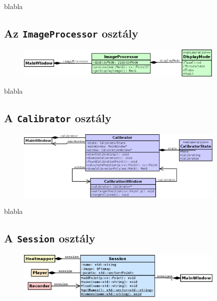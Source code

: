 blabla

\subsection{Az \texttt{ImageProcessor} osztály}\label{sect:imageprocessor}

\begin{figure}[!ht]
\centering
\includegraphics[width=100mm, keepaspectratio]{figures/class_imageprocessor.png}
\end{figure}

blabla

\subsection{A \texttt{Calibrator} osztály}\label{sect:calibrator}

\begin{figure}[!ht]
\centering
\includegraphics[width=100mm, keepaspectratio]{figures/class_calibrator.png}
\end{figure}

blabla

\subsection{A \texttt{Session} osztály}\label{sect:session}

\begin{figure}[!ht]
\centering
\includegraphics[width=100mm, keepaspectratio]{figures/class_session.png}
\end{figure}

